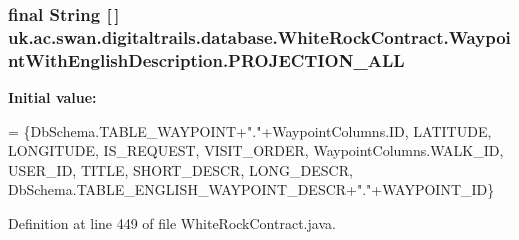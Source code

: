 \hypertarget{classuk_1_1ac_1_1swan_1_1digitaltrails_1_1database_1_1_white_rock_contract_1_1_waypoint_with_english_description_a0297afc392d4349db3bc3c5a57f9659a}{
\subsubsection[{P\+R\+O\+J\+E\+C\+T\+I\+O\+N\+\_\+\+A\+L\+L}]{\setlength{\rightskip}{0pt plus 5cm}final String \mbox{[}$\,$\mbox{]} uk.\+ac.\+swan.\+digitaltrails.\+database.\+White\+Rock\+Contract.\+Waypoint\+With\+English\+Description.\+P\+R\+O\+J\+E\+C\+T\+I\+O\+N\+\_\+\+A\+L\+L\hspace{0.3cm}{\ttfamily [static]}}}\label{classuk_1_1ac_1_1swan_1_1digitaltrails_1_1database_1_1_white_rock_contract_1_1_waypoint_with_english_description_a0297afc392d4349db3bc3c5a57f9659a}
{\bfseries Initial value\+:}
\begin{DoxyCode}
= \{DbSchema.TABLE\_WAYPOINT+\textcolor{stringliteral}{"."}+WaypointColumns.ID, LATITUDE, LONGITUDE, IS\_REQUEST, VISIT\_ORDER,
                                                        WaypointColumns.WALK\_ID, USER\_ID,
                                                        TITLE, SHORT\_DESCR, LONG\_DESCR, 
      DbSchema.TABLE\_ENGLISH\_WAYPOINT\_DESCR+\textcolor{stringliteral}{"."}+WAYPOINT\_ID\}
\end{DoxyCode}


Definition at line 449 of file White\+Rock\+Contract.\+java.

